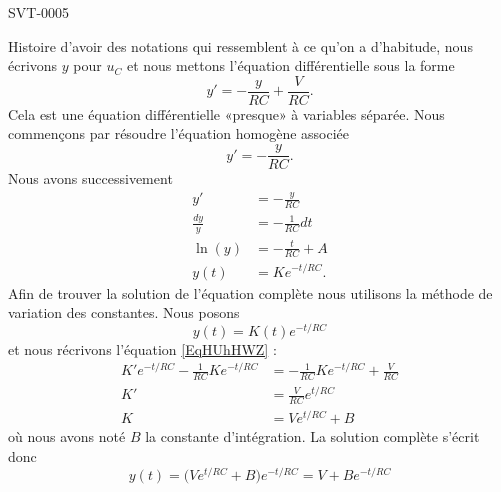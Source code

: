 
\begin{corrige}{SVT-0005}

    Histoire d'avoir des notations qui ressemblent à ce qu'on a d'habitude, nous écrivons \( y\) pour \( u_C\) et nous mettons l'équation différentielle sous la forme
    \begin{equation}        \label{EqHUhHWZ}
        y'=-\frac{ y }{ RC }+\frac{ V }{ RC }.
    \end{equation}
    Cela est une équation différentielle «presque» à variables séparée. Nous commençons par résoudre l'équation homogène associée
    \begin{equation}
        y'=-\frac{ y }{ RC }.
    \end{equation}
    Nous avons successivement
    \begin{subequations}
        \begin{align}
            y'&=-\frac{ y }{ RC }\\
            \frac{ dy }{ y }&=-\frac{1}{ RC }dt\\
            \ln(y)&=-\frac{ t }{ RC }+A\\
            y(t)&=K e^{-t/RC}.
        \end{align}
    \end{subequations}
    Afin de trouver la solution de l'équation complète nous utilisons la méthode de variation des constantes. Nous posons
    \begin{equation}
        y(t)=K(t) e^{-t/RC}
    \end{equation}
    et nous récrivons l'équation \eqref{EqHUhHWZ} :
    \begin{subequations}
        \begin{align}
            K' e^{-t/RC}-\frac{1}{ RC }K e^{-t/RC}&=-\frac{1}{ RC }K e^{-t/RC}+\frac{ V }{ RC }\\
            K'&=\frac{ V }{ RC } e^{t/RC}\\
            K&=V e^{t/RC}+B
        \end{align}
    \end{subequations}
    où nous avons noté \( B\) la constante d'intégration. La solution complète s'écrit donc
    \begin{equation}
        y(t)=\big( V e^{t/RC}+B \big) e^{-t/RC}=V+B e^{-t/RC}
    \end{equation}

\end{corrige}
